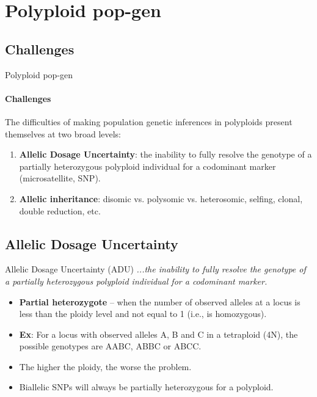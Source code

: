 \documentclass[presentation,sansserif]{beamer}
\begin{document}
\section{Polyploid pop-gen}

\subsection{Challenges}

\begin{frame}[t]{Polyploid pop-gen}
\framesubtitle{Challenges}
	The difficulties of making population genetic inferences in polyploids present themselves at two broad levels:
	\vspace{0.1in}

	\begin{enumerate}
		\item \textbf{Allelic Dosage Uncertainty}: the inability to fully resolve the genotype of a partially heterozygous polyploid individual for a codominant marker (microsatellite, SNP).
		\vspace{0.2in}

		\item \textbf{Allelic inheritance}: disomic vs. polysomic vs. heterosomic, selfing, clonal, double reduction, etc.
	\end{enumerate}


\end{frame}

\subsection{Allelic Dosage Uncertainty}

\begin{frame}[t]{Allelic Dosage Uncertainty (ADU)}
	\textit{...the inability to fully resolve the genotype of a partially heterozygous polyploid individual for a codominant marker.}
	\vspace{0.1in}

	\begin{itemize}
		\item \textbf{Partial heterozygote} -- when the number of observed alleles at a locus is less than the ploidy level and not equal to 1 (i.e., is homozygous).
		\vspace{0.1in}

		\item \textbf{Ex}: For a locus with observed alleles A, B and C in a tetraploid (4N), the possible genotypes are AABC, ABBC or ABCC.
		\vspace{0.1in}

		\item The higher the ploidy, the worse the problem.
		\vspace{0.1in}

		\item Biallelic SNPs will always be partially heterozygous for a polyploid.

	\end{itemize}

\end{frame}
\end{document}
